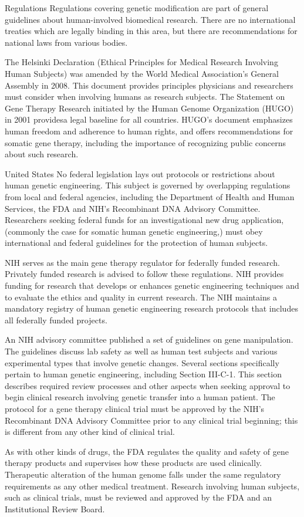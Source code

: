 Regulations
Regulations covering genetic modification are part of general guidelines about human-involved biomedical research. There are no international treaties which are legally binding in this area, but there are recommendations for national laws from various bodies.

The Helsinki Declaration (Ethical Principles for Medical Research Involving Human Subjects) was amended by the World Medical Association's General Assembly in 2008. This document provides principles physicians and researchers must consider when involving humans as research subjects. The Statement on Gene Therapy Research initiated by the Human Genome Organization (HUGO) in 2001 providesa legal baseline for all countries. HUGO's document emphasizes human freedom and adherence to human rights, and offers recommendations for somatic gene therapy, including the importance of recognizing public concerns about such research.

United States
No federal legislation lays out protocols or restrictions about human genetic engineering. This subject is governed by overlapping regulations from local and federal agencies, including the Department of Health and Human Services, the FDA and NIH's Recombinant DNA Advisory Committee. Researchers seeking federal funds for an investigational new drug application, (commonly the case for somatic human genetic engineering,) must obey international and federal guidelines for the protection of human subjects.

NIH serves as the main gene therapy regulator for federally funded research. Privately funded research is advised to follow these regulations. NIH provides funding for research that develops or enhances genetic engineering techniques and to evaluate the ethics and quality in current research. The NIH maintains a mandatory registry of human genetic engineering research protocols that includes all federally funded projects.

An NIH advisory committee published a set of guidelines on gene manipulation. The guidelines discuss lab safety as well as human test subjects and various experimental types that involve genetic changes. Several sections specifically pertain to human genetic engineering, including Section III-C-1. This section describes required review processes and other aspects when seeking approval to begin clinical research involving genetic transfer into a human patient. The protocol for a gene therapy clinical trial must be approved by the NIH's Recombinant DNA Advisory Committee prior to any clinical trial beginning; this is different from any other kind of clinical trial.

As with other kinds of drugs, the FDA regulates the quality and safety of gene therapy products and supervises how these products are used clinically. Therapeutic alteration of the human genome falls under the same regulatory requirements as any other medical treatment. Research involving human subjects, such as clinical trials, must be reviewed and approved by the FDA and an Institutional Review Board.


